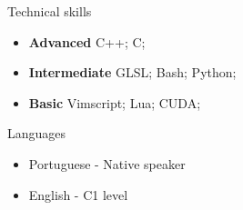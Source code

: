 \documentclass[]{mcdowellcv}
\begin{document}
	\begin{cvsection}{Technical skills}
		\begin{cvsubsection}{}{}{}
			\begin{itemize}
				\item \textbf{Advanced} C++; C;
				\item \textbf{Intermediate} GLSL; Bash; Python;
				\item \textbf{Basic} Vimscript; Lua; CUDA;
			\end{itemize}
		\end{cvsubsection}
	\end{cvsection}

	\begin{cvsection}{Languages}
		\begin{cvsubsection}{}{}{}
			\begin{itemize}
				\item Portuguese - Native speaker
				\item English - C1 level
			\end{itemize}
		\end{cvsubsection}
	\end{cvsection}
\end{document}
